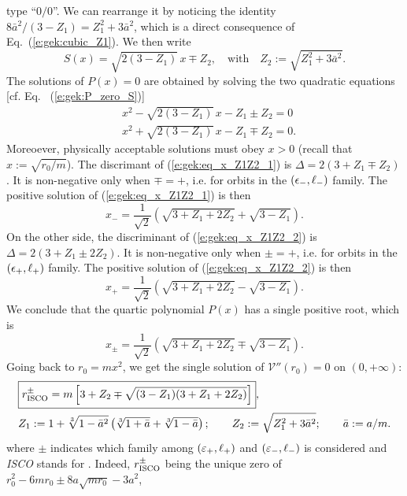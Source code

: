 type ``$0/0$''. We can rearrange it by noticing the identity
${8 \bar{a}^2}/(3 - Z_1) = Z_1^2 + 3 \bar{a}^2$, which is a direct consequence of
Eq.~(\ref{e:gek:cubic_Z1}). We then write
\[
     S(x) = \sqrt{2(3-Z_1)} \, x \mp Z_2,\quad\mbox{with}\quad
    Z_2 := \sqrt{Z_1^2  + 3 \bar{a}^2} .
\]
The solutions of $P(x)=0$ are obtained by solving the two quadratic equations
[cf. Eq.~ (\ref{e:gek:P_zero_S})]
\begin{subequations}
\begin{align}
& x^2 - \sqrt{2(3-Z_1)}\, x - Z_1 \pm Z_2 = 0 \label{e:gek:eq_x_Z1Z2_1} \\
& x^2 + \sqrt{2(3-Z_1)}\, x - Z_1 \mp Z_2 = 0 .  \label{e:gek:eq_x_Z1Z2_2}
\end{align}
\end{subequations}
Moreoever, physically acceptable solutions must obey $x>0$ (recall that
$x := \sqrt{r_0/m}$). The discrimant of (\ref{e:gek:eq_x_Z1Z2_1}) is
$\Delta = 2(3+Z_1\mp Z_2)$. It is non-negative only when $\mp = +$, i.e.
for orbits in the $(\epsilon_-,\ell_-)$ family. The positive solution of (\ref{e:gek:eq_x_Z1Z2_1})
is then
\[
    x_- = \frac{1}{\sqrt{2}} \left( \sqrt{3 + Z_1 + 2 Z_2} + \sqrt{3- Z_1} \right) .
\]
On the other side, the discriminant of (\ref{e:gek:eq_x_Z1Z2_2})
is $\Delta = 2(3+Z_1 \pm 2 Z_2)$. It is non-negative only when $\pm = +$, i.e.
for orbits in the $(\epsilon_+,\ell_+)$ family. The positive solution of (\ref{e:gek:eq_x_Z1Z2_2})
is then
\[
    x_+ = \frac{1}{\sqrt{2}} \left( \sqrt{3 + Z_1 + 2 Z_2} - \sqrt{3- Z_1} \right) .
\]
We conclude that the quartic polynomial $P(x)$ has a single positive root, which
is
\[
    x_\pm = \frac{1}{\sqrt{2}}\left( \sqrt{3 + Z_1 + 2 Z_2} \mp \sqrt{3- Z_1} \right) .
\]
Going back to $r_0 = m x^2$, we get the single solution of $\mathcal{V}''(r_0) = 0$
on $(0, +\infty)$:
\begin{align}
 & \fbox{$\displaystyle r_{\rm ISCO}^\pm = m \left[ 3 + Z_2 \mp \sqrt{(3 - Z_1)(3 + Z_1 + 2 Z_2)} \right] $} ,
    \label{e:gek:r_ISCO} \\
&  Z_1 := 1 + \sqrt[3]{1 - \bar{a}^2} \left( \sqrt[3]{1 + \bar{a}} + \sqrt[3]{1 - \bar{a}} \right) ; \qquad
  Z_2 := \sqrt{Z_1^2  + 3 \bar{a}^2} ; \qquad \bar{a} := a/m .\nonumber
\end{align}
where $\pm$ indicates which family among $(\varepsilon_+,\ell_+)$ and $(\varepsilon_-,\ell_-)$ is
considered and \emph{ISCO} stands for .
Indeed, $r_{\rm ISCO}^\pm $ being the unique zero of $r_0^2 - 6 m r_0 \pm 8 a \sqrt{m r_0} - 3 a^2$,
